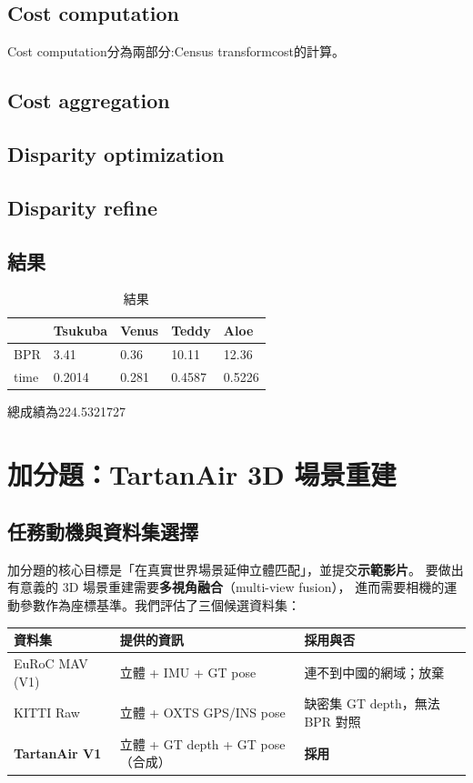 \documentclass[12pt]{article}
\begin{document}
\subsection{Cost computation}
Cost computation分為兩部分:Census transformcost的計算。

\subsection{Cost aggregation}

\subsection{Disparity optimization}

\subsection{Disparity refine}

\subsection{結果}
\begin{table}[H]
    \centering
    \caption{結果}
    \begin{tabular}{lllll}
    \hline
          & Tsukuba & Venus & Teddy & Aloe \\ \hline
        BPR & 3.41 & 0.36 & 10.11 & 12.36 \\ 
        time & 0.2014 & 0.281 & 0.4587 & 0.5226 \\ \hline
    \end{tabular}
\end{table}
總成績為224.5321727


\section{加分題：TartanAir 3D 場景重建}
\subsection{任務動機與資料集選擇}
\label{sec:bonus-dataset}
加分題的核心目標是「在真實世界場景延伸立體匹配」，並提交\textbf{示範影片}。
要做出有意義的 3D 場景重建需要\textbf{多視角融合}（multi-view fusion），
進而需要相機的運動參數作為座標基準。我們評估了三個候選資料集：

\begin{table}[H]\centering
\begin{tabular}{lll}
  \toprule
  資料集 & 提供的資訊 & 採用與否 \\
  \midrule
  EuRoC MAV (V1) & 立體 + IMU + GT pose & 連不到中國的網域；放棄 \\
  KITTI Raw      & 立體 + OXTS GPS/INS pose & 缺密集 GT depth，無法 BPR 對照 \\
  \textbf{TartanAir V1} & 立體 + GT depth + GT pose（合成） & \textbf{採用} \\
  \bottomrule
\end{tabular}
\end{table}
\end{document}
